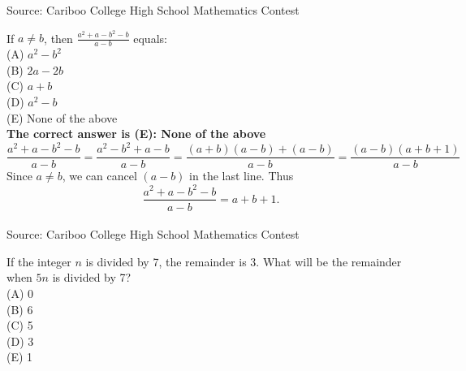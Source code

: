 \documentclass{article}
\begin{document}
\scriptsize
Source: Cariboo College High School Mathematics Contest

\normalsize
If $a\neq b$, then $\frac{a^{2}+a-b^{2}-b}{a-b}$ equals:\\
(A) $a^{2}-b^{2}$\\
(B) $2a-2b$\\
(C) $a+b$\\
(D) $a^{2}-b$\\
(E) None of the above\\


\textbf{The correct answer is (E): None of the above}\\
\begin{equation*}
\frac{a^{2}+a-b^{2}-b}{a-b}=\frac{a^{2}-b^{2}+a-b}{a-b}=\frac{(a+b)(a-b)+(a-b)}{a-b}=\frac{(a-b)(a+b+1)}{a-b}
\end{equation*}
Since $a\neq b$, we can cancel $(a-b)$ in the last line. Thus
\begin{equation*}
\frac{a^{2}+a-b^{2}-b}{a-b}=a+b+1.
\end{equation*}
\\[5 ex]

\scriptsize
Source: Cariboo College High School Mathematics Contest

\normalsize
If the integer $n$ is divided by 7, the remainder is 3.  What will be the remainder when $5n$ is divided by 7?\\
(A) 0\\
(B) 6\\
(C) 5\\
(D) 3\\
(E) 1\\
\end{document}
